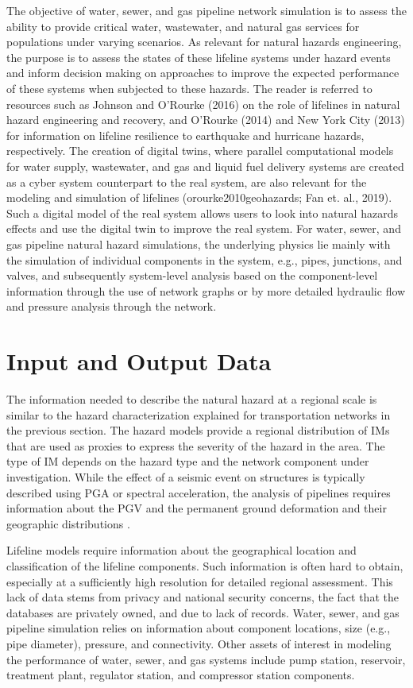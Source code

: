 The objective of water, sewer, and gas pipeline network simulation is to assess the ability to provide critical water, wastewater, and natural gas services for populations under varying scenarios. As relevant for natural hazards engineering, the purpose is to assess the states of these lifeline systems under hazard events and inform decision making on approaches to improve the expected performance of these systems when subjected to these hazards. The reader is referred to resources such as Johnson and O’Rourke (2016) on the role of lifelines in natural hazard engineering and recovery, and O’Rourke (2014) and New York City (2013) for information on lifeline resilience to earthquake and hurricane hazards, respectively. The creation of digital twins, where parallel computational models for water supply, wastewater, and gas and liquid fuel delivery systems are created as a cyber system counterpart to the real system, are also relevant for the modeling and simulation of lifelines (orourke2010geohazards; Fan et. al., 2019). Such a digital model of the real system allows users to look into natural hazards effects and use the digital twin to improve the real system. For water, sewer, and gas pipeline natural hazard simulations, the underlying physics lie mainly with the simulation of individual components in the system, e.g., pipes, junctions, and valves, and subsequently system-level analysis based on the component-level information through the use of network graphs or by more detailed hydraulic flow and pressure analysis through the network.
 
\section{Input and Output Data}
\label{sec:perf_pipeline_io}

The information needed to describe the natural hazard at a regional scale is similar to the hazard characterization explained for transportation networks in the previous section. The hazard models provide a regional distribution of IMs that are used as proxies to express the severity of the hazard in the area. The type of IM depends on the hazard type and the network component under investigation. While the effect of a seismic event on structures is typically described using PGA or spectral acceleration, the analysis of pipelines requires information about the PGV and the permanent ground deformation and their geographic distributions \citep{romero2010seismic}.

Lifeline models require information about the geographical location and classification of the lifeline components. Such information is often hard to obtain, especially at a sufficiently high resolution for detailed regional assessment. This lack of data stems from privacy and national security concerns, the fact that the databases are privately owned, and due to lack of records. Water, sewer, and gas pipeline simulation relies on information about component locations, size (e.g., pipe diameter), pressure, and connectivity. Other assets of interest in modeling the performance of water, sewer, and gas systems include pump station, reservoir, treatment plant, regulator station, and compressor station components.

